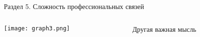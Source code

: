 \begin{frame}{Раздел 5. Сложность профессиональных связей}
\begin{columns}[T] %
\begin{column}{0.7\textwidth} %
\centering
          \texttt{[image: graph3.png]}
\end{column}
\begin{column}{0.3\textwidth} %
Другая важная мысль
\end{column}
\end{columns}
\end{frame}


